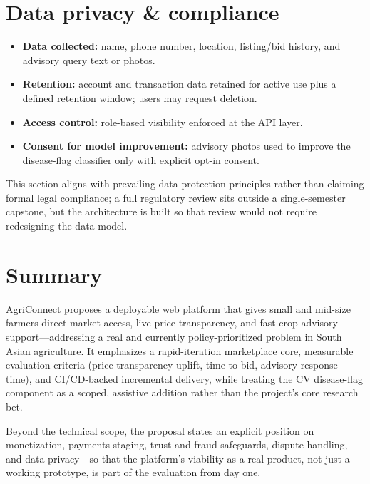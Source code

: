 \documentclass[11pt,a4paper]{article}
\begin{document}
\section{Data privacy \& compliance}
\begin{itemize}[leftmargin=0.7cm]
    \item \textbf{Data collected:} name, phone number, location, listing/bid history, and advisory query text or photos.
    \item \textbf{Retention:} account and transaction data retained for active use plus a defined retention window; users may request deletion.
    \item \textbf{Access control:} role-based visibility enforced at the API layer.
    \item \textbf{Consent for model improvement:} advisory photos used to improve the disease-flag classifier only with explicit opt-in consent.
\end{itemize}
This section aligns with prevailing data-protection principles rather than claiming formal legal compliance; a full regulatory review sits outside a single-semester capstone, but the architecture is built so that review would not require redesigning the data model.

\section{Summary}
AgriConnect proposes a deployable web platform that gives small and mid-size farmers direct market access, live price transparency, and fast crop advisory support---addressing a real and currently policy-prioritized problem in South Asian agriculture. It emphasizes a rapid-iteration marketplace core, measurable evaluation criteria (price transparency uplift, time-to-bid, advisory response time), and CI/CD-backed incremental delivery, while treating the CV disease-flag component as a scoped, assistive addition rather than the project's core research bet.

Beyond the technical scope, the proposal states an explicit position on monetization, payments staging, trust and fraud safeguards, dispute handling, and data privacy---so that the platform's viability as a real product, not just a working prototype, is part of the evaluation from day one.
\end{document}
